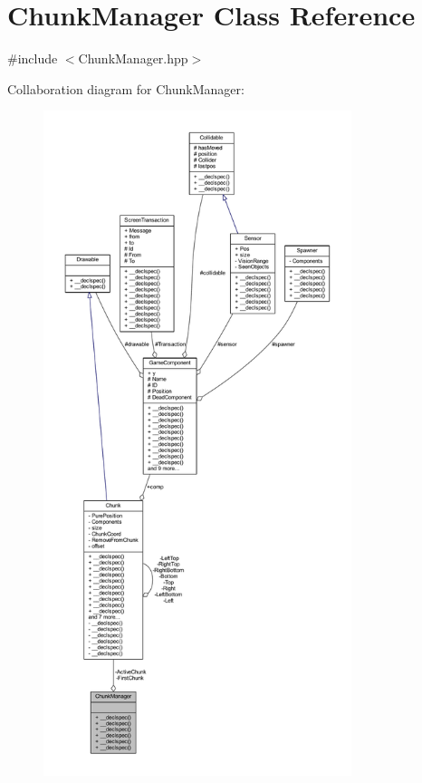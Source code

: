 \hypertarget{class_chunk_manager}{\section{Chunk\-Manager Class Reference}
\label{class_chunk_manager}
}


{\ttfamily \#include $<$Chunk\-Manager.\-hpp$>$}



Collaboration diagram for Chunk\-Manager\-:
\nopagebreak
\begin{figure}[H]
\begin{center}
\leavevmode
\includegraphics[height=550pt]{class_chunk_manager__coll__graph}
\end{center}
\end{figure}
